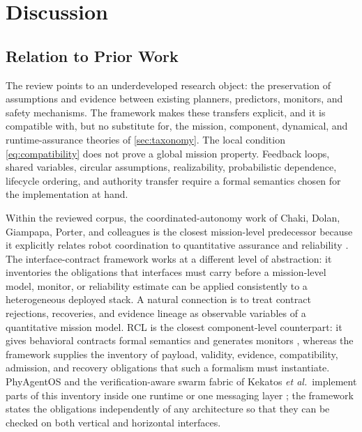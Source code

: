 \section{Discussion}
\label{sec:discussion}

\subsection{Relation to Prior Work}

The review points to an underdeveloped research object: the preservation of
assumptions and evidence between existing planners, predictors, monitors, and
safety mechanisms.  The framework makes these transfers explicit, and it is
compatible with, but no substitute for, the mission, component, dynamical, and
runtime-assurance theories of \cref{sec:taxonomy}.  The local condition
\eqref{eq:compatibility} does not prove a global mission property.  Feedback
loops, shared variables, circular assumptions, realizability, probabilistic
dependence, lifecycle ordering, and authority transfer require a formal
semantics chosen for the implementation at hand.

Within the reviewed corpus, the coordinated-autonomy work of Chaki, Dolan,
Giampapa, Porter, and colleagues is the closest mission-level predecessor
because it explicitly relates robot coordination to quantitative assurance and
reliability
\cite{chaki2013assurance,chaki2013probabilistic,porter2013reliability,
stancliff2006missionreliability}.  The interface-contract framework works at a
different level of abstraction: it inventories the obligations that interfaces
must carry before a mission-level model, monitor, or reliability estimate can be
applied consistently to a heterogeneous deployed stack.  A natural connection
is to treat contract rejections, recoveries, and evidence lineage as observable
variables of a quantitative mission model.  RCL is the closest component-level
counterpart: it gives behavioral contracts formal semantics and generates
monitors \cite{luckcuck2026compositional}, whereas the framework supplies the
inventory of payload, validity, evidence, compatibility, admission, and recovery
obligations that such a formalism must instantiate.  PhyAgentOS and the
verification-aware swarm fabric of Kekatos \emph{et al.}\ implement parts of
this inventory inside one runtime or one messaging layer
\cite{liu2026phyagentos,kekatos2026swarmrta}; the framework states the
obligations independently of any architecture so that they can be checked on
both vertical and horizontal interfaces.

